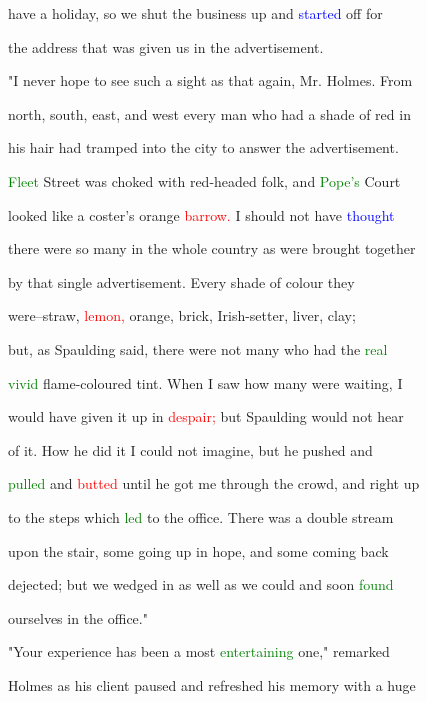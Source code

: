  have a \textcolor{BurntOrange}{holiday,} so we shut the business up and \textcolor{blue}{started} off for

 the address that was given us in the advertisement.



 "I never \textcolor{BurntOrange}{hope} to see such a sight as that again, Mr. Holmes. From

 north, south, east, and west every man who had a shade of red in

 his hair had tramped into the city to answer the advertisement.

 \textcolor{green}{Fleet} Street was choked with red-headed folk, and \textcolor{green}{Pope's} \textcolor{BurntOrange}{Court}

 looked like a coster's orange \textcolor{red}{barrow.} I should not have \textcolor{blue}{thought}

 there were so many in the whole country as were brought together

 by that single advertisement. Every shade of colour they

 were--straw, \textcolor{red}{lemon,} orange, brick, Irish-setter, liver, clay;

 but, as Spaulding said, there were not many who had the \textcolor{green}{real}

 \textcolor{green}{vivid} flame-coloured tint. When I saw how many were \textcolor{BurntOrange}{waiting,} I

 would have given it up in \textcolor{red}{despair;} but Spaulding would not hear

 of it. How he did it I could not imagine, but he pushed and

 \textcolor{green}{pulled} and \textcolor{red}{butted} until he got me through the crowd, and right up

 to the steps which \textcolor{green}{led} to the office. There was a double stream

 upon the stair, some going up in \textcolor{BurntOrange}{hope,} and some coming back

 dejected; but we wedged in as well as we could and soon \textcolor{green}{found}

 ourselves in the office."



 "Your experience has been a most \textcolor{green}{entertaining} one," remarked

 Holmes as his client paused and refreshed his memory with a huge

